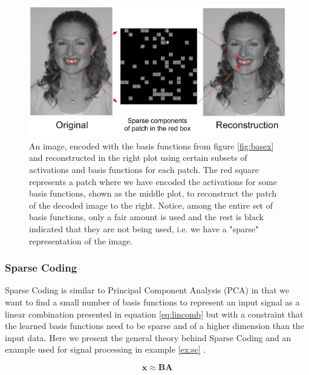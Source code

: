 \begin{ex}{}
\begin{figure}[H]
\centering
\includegraphics[scale=0.30]{./figures/Sparsejen_black_v2.jpg}
\caption{An image, encoded with the basis functions from figure \ref{fig:basex} and reconstructed in the right plot using certain subsets of activations and basis functions for each patch. The red square represents a patch where we have encoded the activations for some basis functions, shown as the middle plot, to reconstruct the patch of the decoded image to the right. Notice, among the entire set of basis functions, only a fair amount is used and the rest is black indicated that they are not being used, i.e. we have a "sparse" representation of the image. \protect\footnotemark
}
\label{fig:recex}
\end{figure}

\end{ex}
\newpage

\subsubsection{Sparse Coding}

\label{sec:sc}
Sparse Coding is similar to Principal Component Analysis (PCA) in that we want to find a small number of basis functions to represent an input signal as a linear combination presented in equation \ref{eq:lincomb} but with a constraint that the learned basis functions need to be sparse and of a higher dimension than the input data. Here we present the general theory behind Sparse Coding and an example used for signal processing in example \ref{ex:sc} \cite{olshausen}.

\begin{equation}
\mathbf{x} \approx \mathbf{BA}
\label{eq:lincomb}
\end{equation}

